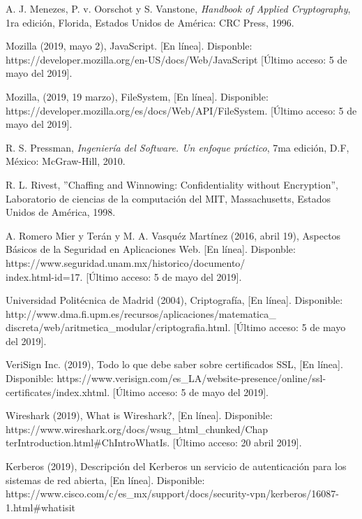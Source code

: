 \documentclass[12pt, a4paper, titlepage]{report}
\begin{document}
\begin{thebibliography}{20}
        A. J. Menezes, P. v. Oorschot y S. Vanstone, \textit{Handbook of Applied Cryptography}, 1ra edición, Florida, Estados Unidos de América: CRC Press, 1996.
		
		Mozilla (2019, mayo 2), JavaScript. [En línea]. Disponble:
		https://developer.mozilla.org/en-US/docs/Web/JavaScript [Último acceso: 5 de mayo del 2019].
		
        Mozilla, (2019, 19 marzo), FileSystem, [En línea]. Disponible: https://developer.mozilla.org/es/docs/Web/API/FileSystem. [Último acceso: 5 de mayo del 2019].
		
		R. S. Pressman, \textit{Ingeniería del Software. Un enfoque práctico}, 7ma edición, D.F, México: McGraw-Hill, 2010.
		
		R. L. Rivest, ''Chaffing and Winnowing: Confidentiality without Encryption'', Laboratorio de ciencias de la computación del MIT, Massachusetts, Estados Unidos de América, 1998.
		
		A. Romero Mier y Terán y M. A. Vasquéz Martínez (2016, abril 19), Aspectos Básicos de la Seguridad en Aplicaciones Web. [En línea]. Disponble: https://www.seguridad.unam.mx/historico/documento/\\index.html-id=17. [Último acceso: 5 de mayo del 2019].
        
	    Universidad Politécnica de Madrid (2004), Criptografía, [En línea]. Disponible: http://www.dma.fi.upm.es/recursos/aplicaciones/matematica\_ discreta/web/aritmetica\_modular/criptografia.html. [Último acceso: 5 de mayo del 2019].
	    
        VeriSign Inc. (2019), Todo lo que debe saber sobre certificados SSL, [En línea]. Disponible: https://www.verisign.com/es\_LA/website-presence/online/ssl-certificates/index.xhtml. [Último acceso: 5 de mayo del 2019].
        
        Wireshark (2019), What is Wireshark?, [En línea]. Disponible: https://www.wireshark.org/docs/wsug\_html\_chunked/Chap\\terIntroduction.html\#ChIntroWhatIs. [Último acceso: 20 abril 2019].
        
        Kerberos (2019), Descripción del Kerberos un servicio de autenticación para los sistemas de red abierta, [En línea]. Disponible: https://www.cisco.com/c/es\_mx/support/docs/security-vpn/kerberos/16087-1.html\#whatisit
        
	\end{thebibliography}	
\end{document}
